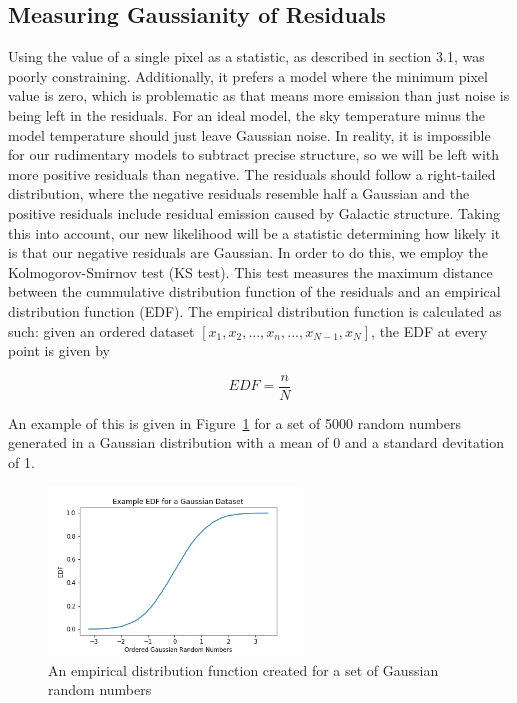 \documentclass[letterpaper, 10pt]{article}
\begin{document}
\subsection{Measuring Gaussianity of Residuals}
Using the value of a single pixel as a statistic, as described in section 3.1, was poorly constraining. Additionally, it prefers a model where the minimum pixel value is zero, which is problematic as that means more emission than just noise is being left in the residuals. For an ideal model, the sky temperature minus the model temperature should just leave Gaussian noise. In reality, it is impossible for our rudimentary models to subtract precise structure, so we will be left with more positive residuals than negative. The residuals should follow a right-tailed distribution, where the negative residuals resemble half a Gaussian and the positive residuals include residual emission caused by Galactic structure. Taking this into account, our new likelihood will be a statistic determining how likely it is that our negative residuals are Gaussian. In order to do this, we employ the Kolmogorov-Smirnov test (KS test). This test measures the maximum distance between the cummulative distribution function of the residuals and an empirical distribution function (EDF). The empirical distribution function is calculated as such: given an ordered dataset $\left[x_1, x_2, ..., x_n,...,x_{N-1}, x_N\right] $, the EDF at every point is given by

\[EDF = \frac{n}{N}\]

An example of this is given in Figure~\ref{edf} for a set of 5000 random numbers generated in a Gaussian distribution with a mean of 0 and a standard devitation of 1. 

\begin{figure}[h]
\begin{center}
\includegraphics[width=0.6\textwidth]{EDFexample.jpg}
\caption{An empirical distribution function created for a set of Gaussian random numbers}
\label{edf}
\end{center}
\end{figure}
\end{document}
